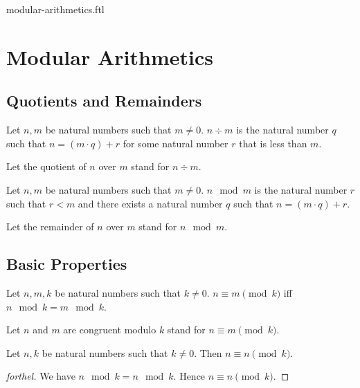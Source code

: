 \documentclass{naproche-library}
\begin{document}
\begin{smodule}{modular-arithmetics.ftl}


  \section*{Modular Arithmetics}

  \subsection*{Quotients and Remainders}

  \begin{definition}[forthel,id=ARITHMETIC_08_8621463798022144]
    Let $n, m$ be natural numbers such that $m \neq 0$.
    $n \div m$ is the natural number $q$ such that $n = (m \cdot q) + r$ for some natural number $r$ that is less than $m$.

    Let the quotient of $n$ over $m$ stand for $n \div m$.
  \end{definition}

  \begin{definition}[forthel,id=ARITHMETIC_08_3560980160184320]
    Let $n, m$ be natural numbers such that $m \neq 0$.
    $n \mod m$ is the natural number $r$ such that $r < m$ and there exists a natural number $q$ such that $n = (m \cdot q) + r$.

    Let the remainder of $n$ over $m$ stand for $n \mod m$.
  \end{definition}


  \subsection*{Basic Properties}

  \begin{definition}[forthel,id=ARITHMETIC_08_5448561831444480]
    Let $n, m, k$ be natural numbers such that $k \neq 0$.
    $n \equiv m \pmod{k}$ iff $n \mod k = m \mod k$.

    Let $n$ and $m$ are congruent modulo $k$ stand for $n \equiv m \pmod{k}$.
  \end{definition}

  \begin{proposition}[forthel,id=ARITHMETIC_08_3818318544764928]
    Let $n, k$ be natural numbers such that $k \neq 0$.
    Then $n \equiv n \pmod{k}$.
  \end{proposition}
  \begin{proof}[forthel]
    We have $n \mod k = n \mod k$.
    Hence $n \equiv n \pmod{k}$.
  \end{proof}


\end{smodule}
\end{document}
